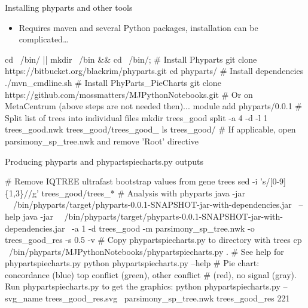 \documentclass[compress,  xelatex, 11pt, xcolor=x11names, aspectratio=169,
	hyperref={
		bookmarks=true,
		unicode=true,
		colorlinks=true,
		pdftitle={HybSeq course},
		plainpages=false,
		pdfauthor={Vojtech Zeisek},
		pdfsubject={Practical processing of HybSeq target enrichment sequencing data on computing grids like MetaCentrum},
		pdfcreator={XeLaTeX},
		pdfkeywords={BASH, command line, GNU, HybSeq, Linux, MetaCentrum, sequencing shell, target enrichment},
		linkcolor=Turquoise4, %
		anchorcolor=DodgerBlue4, %
		citecolor=DodgerBlue4, %
		filecolor=DodgerBlue4, %
		menucolor=Tan4, %
		urlcolor=DarkOliveGreen4 %
		},
	url={hyphens, lowtilde} %
	]{beamer}
\renewcommand{\texttt}[1]{\colorbox{Cornsilk2}{{\ttfamily #1}}}
\begin{document}
\begin{frame}[fragile]{Installing phyparts and other tools}
	\begin{itemize}
		\item Requires \texttt{maven} and several Python packages, installation can be complicated\ldots
	\end{itemize}
	\begin{bashcode}
    cd ~/bin/ || { mkdir ~/bin && cd ~/bin/; }
    # Install Phyparts
    git clone https://bitbucket.org/blackrim/phyparts.git
    cd phyparts/
    # Install dependencies
    ./mvn_cmdline.sh
    # Install PhyParts_PieCharts
    git clone https://github.com/mossmatters/MJPythonNotebooks.git
    # Or on MetaCentrum (above steps are not needed then)...
    module add phyparts/0.0.1
    # Split list of trees into individual files
    mkdir trees_good
    split -a 4 -d -l 1 trees_good.nwk trees_good/trees_good_
    ls trees_good/
    # If applicable, open parsimony_sp_tree.nwk and remove 'Root' directive
	\end{bashcode}
\end{frame}

\begin{frame}[fragile]{Producing phyparts and phypartspiecharts.py outputs}
	\begin{bashcode}
    # Remove IQTREE ultrafast bootstrap values from gene trees
    sed -i 's/\/[0-9]\{1,3\}//g' trees_good/trees_*
    # Analysis with phyparts
    java -jar \
      ~/bin/phyparts/target/phyparts-0.0.1-SNAPSHOT-jar-with-dependencies.jar \
      --help
    java -jar \
      ~/bin/phyparts/target/phyparts-0.0.1-SNAPSHOT-jar-with-dependencies.jar \
      -a 1 -d trees_good -m parsimony_sp_tree.nwk -o trees_good_res -s 0.5 -v
    # Copy phypartspiecharts.py to directory with trees
    cp ~/bin/phyparts/MJPythonNotebooks/phypartspiecharts.py .
    # See help for phypartspiecharts.py
    python phypartspiecharts.py --help
    # Pie chart: concordance (blue) top conflict (green), other conflict
    # (red), no signal (gray). Run phypartspiecharts.py to get the graphics:
    python phypartspiecharts.py --svg_name trees_good_res.svg \
      parsimony_sp_tree.nwk trees_good_res 221
	\end{bashcode}
\end{frame}
\end{document}
